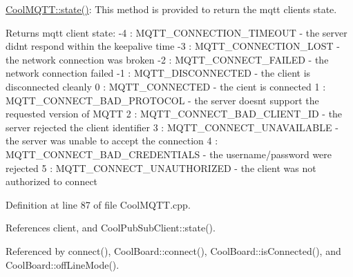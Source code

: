 \hyperlink{class_cool_m_q_t_t_a5d003307eff78efbd585e42b43b72b6d}{Cool\+M\+Q\+T\+T\+::state()}\+: This method is provided to return the mqtt client\textquotesingle{}s state. \begin{DoxyReturn}{Returns}
mqtt client state\+: -\/4 \+: M\+Q\+T\+T\+\_\+\+C\+O\+N\+N\+E\+C\+T\+I\+O\+N\+\_\+\+T\+I\+M\+E\+O\+UT -\/ the server didn\textquotesingle{}t respond within the keepalive time -\/3 \+: M\+Q\+T\+T\+\_\+\+C\+O\+N\+N\+E\+C\+T\+I\+O\+N\+\_\+\+L\+O\+ST -\/ the network connection was broken -\/2 \+: M\+Q\+T\+T\+\_\+\+C\+O\+N\+N\+E\+C\+T\+\_\+\+F\+A\+I\+L\+ED -\/ the network connection failed -\/1 \+: M\+Q\+T\+T\+\_\+\+D\+I\+S\+C\+O\+N\+N\+E\+C\+T\+ED -\/ the client is disconnected cleanly 0 \+: M\+Q\+T\+T\+\_\+\+C\+O\+N\+N\+E\+C\+T\+ED -\/ the cient is connected 1 \+: M\+Q\+T\+T\+\_\+\+C\+O\+N\+N\+E\+C\+T\+\_\+\+B\+A\+D\+\_\+\+P\+R\+O\+T\+O\+C\+OL -\/ the server doesn\textquotesingle{}t support the requested version of M\+Q\+TT 2 \+: M\+Q\+T\+T\+\_\+\+C\+O\+N\+N\+E\+C\+T\+\_\+\+B\+A\+D\+\_\+\+C\+L\+I\+E\+N\+T\+\_\+\+ID -\/ the server rejected the client identifier 3 \+: M\+Q\+T\+T\+\_\+\+C\+O\+N\+N\+E\+C\+T\+\_\+\+U\+N\+A\+V\+A\+I\+L\+A\+B\+LE -\/ the server was unable to accept the connection 4 \+: M\+Q\+T\+T\+\_\+\+C\+O\+N\+N\+E\+C\+T\+\_\+\+B\+A\+D\+\_\+\+C\+R\+E\+D\+E\+N\+T\+I\+A\+LS -\/ the username/password were rejected 5 \+: M\+Q\+T\+T\+\_\+\+C\+O\+N\+N\+E\+C\+T\+\_\+\+U\+N\+A\+U\+T\+H\+O\+R\+I\+Z\+ED -\/ the client was not authorized to connect 
\end{DoxyReturn}


Definition at line 87 of file Cool\+M\+Q\+T\+T.\+cpp.



References client, and Cool\+Pub\+Sub\+Client\+::state().



Referenced by connect(), Cool\+Board\+::connect(), Cool\+Board\+::is\+Connected(), and Cool\+Board\+::off\+Line\+Mode().


